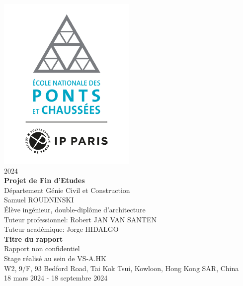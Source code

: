 \documentclass[11pt,titlepage]{article}
\begin{document}
\renewcommand{\headrulewidth}{0pt}

\pagestyle{fancy}
\fancyhead{} %
\fancyfoot{} %
\fancyfoot[R]{\thepage}

\begin{titlepage}
\center
\includegraphics[scale=0.5]{img/logo/logo_enpc.png}
\\[0.25cm]
{\large 2024}
\\[0.75cm]
{\LARGE \bfseries Projet de Fin d'Etudes}
\\[1cm]
{\Large Département Génie Civil et Construction}
\\[1cm]
{\Large Samuel ROUDNINSKI}
\\[0.5cm]
{\Large Élève ingénieur, double-diplôme d'architecture}
\\[1cm]
{\Large Tuteur professionnel: Robert JAN VAN SANTEN}
\\[1cm]
{\Large Tuteur académique: Jorge HIDALGO}
\\[1cm]
{\huge \bfseries Titre du rapport}
\\[1cm]
{\Large Rapport non confidentiel}
\\[1.5cm]
{ Stage réalisé au sein de VS-A.HK}
\\[0.25cm]
{W2, 9/F, 93 Bedford Road, Tai Kok Tsui, Kowloon, Hong Kong SAR, China}
\\[0.25cm]
{ 18 mars 2024 - 18 septembre 2024}
\end{titlepage}

\def\abstract{
   \vfil
\begin{center}%
{\bfseries \abstractname\vspace{-.5em}}%
\end{center}
\quotation
}
\end{document}
